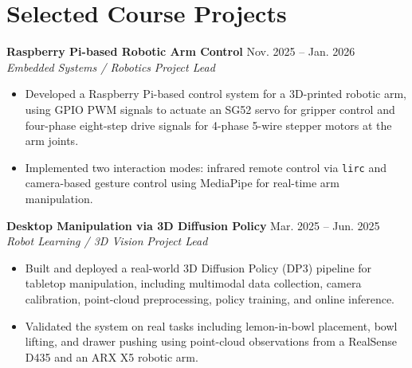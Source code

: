 \documentclass[10pt,a4paper]{article}
\newcommand{\entry}[4]{%
  \textbf{#1} \hfill #2\\
  \textit{#3} \hfill \textit{#4}\\[-0.35em]
}
\newcommand{\cvitem}[1]{\item \small #1}
\begin{document}
\section*{Selected Course Projects}


\entry{Raspberry Pi-based Robotic Arm Control}{Nov. 2025 -- Jan. 2026}{Embedded Systems / Robotics}{Project Lead}
\begin{itemize}[leftmargin=1.2em, topsep=0.2em, itemsep=0.18em]
  \cvitem{Developed a Raspberry Pi-based control system for a 3D-printed robotic arm, using GPIO PWM signals to actuate an SG52 servo for gripper control and four-phase eight-step drive signals for 4-phase 5-wire stepper motors at the arm joints.}
  \cvitem{Implemented two interaction modes: infrared remote control via \texttt{lirc} and camera-based gesture control using MediaPipe for real-time arm manipulation.}
\end{itemize}

\entry{Desktop Manipulation via 3D Diffusion Policy}{Mar. 2025 -- Jun. 2025}{Robot Learning / 3D Vision}{Project Lead}
\begin{itemize}[leftmargin=1.2em, topsep=0.2em, itemsep=0.18em]
  \cvitem{Built and deployed a real-world 3D Diffusion Policy (DP3) pipeline for tabletop manipulation, including multimodal data collection, camera calibration, point-cloud preprocessing, policy training, and online inference.}
  \cvitem{Validated the system on real tasks including lemon-in-bowl placement, bowl lifting, and drawer pushing using point-cloud observations from a RealSense D435 and an ARX X5 robotic arm.}
\end{itemize}

\end{document}
